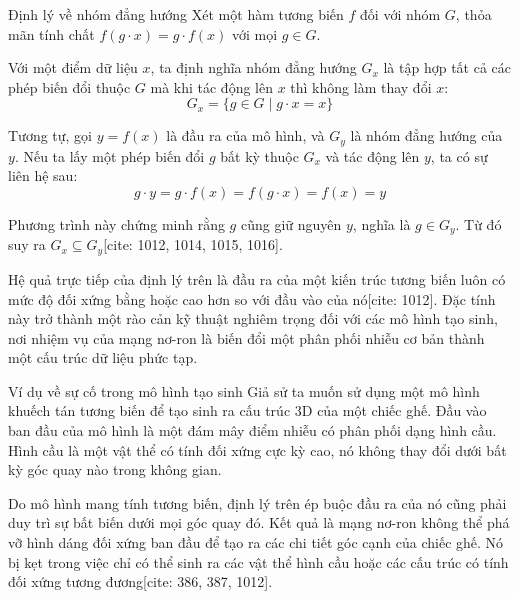 \begin{infobox}{Định lý về nhóm đẳng hướng}
Xét một hàm tương biến $f$ đối với nhóm $G$, thỏa mãn tính chất $f(g \cdot x) = g \cdot f(x)$ với mọi $g \in G$.

Với một điểm dữ liệu $x$, ta định nghĩa nhóm đẳng hướng $G_x$ là tập hợp tất cả các phép biến đổi thuộc $G$ mà khi tác động lên $x$ thì không làm thay đổi $x$:
\begin{equation}
    G_x = \{g \in G \mid g \cdot x = x\}
\end{equation}

Tương tự, gọi $y = f(x)$ là đầu ra của mô hình, và $G_y$ là nhóm đẳng hướng của $y$. Nếu ta lấy một phép biến đổi $g$ bất kỳ thuộc $G_x$ và tác động lên $y$, ta có sự liên hệ sau:
\begin{equation}
    g \cdot y = g \cdot f(x) = f(g \cdot x) = f(x) = y
\end{equation}

Phương trình này chứng minh rằng $g$ cũng giữ nguyên $y$, nghĩa là $g \in G_y$. Từ đó suy ra $G_x \subseteq G_y$[cite: 1012, 1014, 1015, 1016].
\end{infobox}

Hệ quả trực tiếp của định lý trên là đầu ra của một kiến trúc tương biến luôn có mức độ đối xứng bằng hoặc cao hơn so với đầu vào của nó[cite: 1012]. Đặc tính này trở thành một rào cản kỹ thuật nghiêm trọng đối với các mô hình tạo sinh, nơi nhiệm vụ của mạng nơ-ron là biến đổi một phân phối nhiễu cơ bản thành một cấu trúc dữ liệu phức tạp.

\begin{examplebox}{Ví dụ về sự cố trong mô hình tạo sinh}
Giả sử ta muốn sử dụng một mô hình khuếch tán tương biến để tạo sinh ra cấu trúc 3D của một chiếc ghế. Đầu vào ban đầu của mô hình là một đám mây điểm nhiễu có phân phối dạng hình cầu. Hình cầu là một vật thể có tính đối xứng cực kỳ cao, nó không thay đổi dưới bất kỳ góc quay nào trong không gian. 

Do mô hình mang tính tương biến, định lý trên ép buộc đầu ra của nó cũng phải duy trì sự bất biến dưới mọi góc quay đó. Kết quả là mạng nơ-ron không thể phá vỡ hình dáng đối xứng ban đầu để tạo ra các chi tiết góc cạnh của chiếc ghế. Nó bị kẹt trong việc chỉ có thể sinh ra các vật thể hình cầu hoặc các cấu trúc có tính đối xứng tương đương[cite: 386, 387, 1012].
\end{examplebox}

